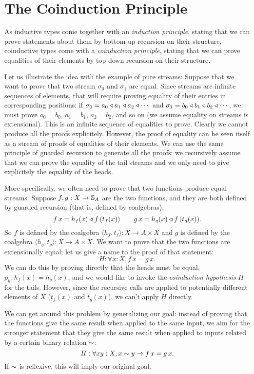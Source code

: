 \section{The Coinduction Principle}

As inductive types come together with an {\em induction principle}, stating that we can prove statements about them by bottom-up recursion on their structure, coinductive types come with a {\em coinduction principle}, stating that we can prove equalities of their elements by top-down recursion on their structure.

Let us illustrate the idea with the example of pure streams:
Suppose that we want to prove that two stream $\sigma_0$ and $\sigma_1$ are equal.
Since streams are infinite sequences of elements, that will require proving equality of their entries in corresponding positions: if $\sigma_0 = a_0\triangleleft a_1\triangleleft a_2\triangleleft \cdots$ and  $\sigma_1 = b_0\triangleleft b_1\triangleleft b_2\triangleleft \cdots$, we must prove $a_0 = b_0$, $a_1 = b_1$, $a_2=b_2$, and so on (we assume equality on streams is extensional).
This is an infinite sequence of equalities to prove.
Clearly we cannot produce all the proofs explicitely.
However, the proof of equality can be seen itself as a stream of proofs of equalities of their elements.
We can use the same principle of guarded recursion to generate all the proofs: we recursively assume that we can prove the equality of the tail streams and we only need to give explicitely the equality of the heads.

More specifically, we often need to prove that two functions produce equal streams.
Suppose $f,g:X \rightarrow \mathbb{S}_{A}$ are the two functions, and they are both defined by guarded recursion (that is, defined by coalgebras):
$$
f\,x = h_f(x) \triangleleft f\,(t_f(x)) \qquad g\,x = h_g(x) \triangleleft f\,(t_g(x)).
$$
So $f$ is defined by the coalgebra $\langle h_f, t_f\rangle : X \rightarrow A\times X$ and $g$ is defined by the coalgebra $\langle h_g, t_g\rangle : X \rightarrow A\times X$.
We want to prove that the two functions are extensionally equal; let us give a name to the proof of that statement:
$$
H: \forall x:X, f\,x = g\,x.
$$
We can do this by proving directly that the heads must be equal, $p_h:h_f(x) = h_g(x)$, and we would like to invoke the {\em coinduction hypothesis} $H$ for the tails.
However, since the recursive calls are applied to potentially different elements of $X$ ($t_f(x)$ and $t_g(x)$), we can't apply $H$ directly.

We can get around this problem by generalizing our goal: instead of proving that the functions give the same result when applied to the same input, we aim for the stronger statement that they give the same result when applied to inputs related by a certain binary relation $\sim$:
$$
H: \forall x y:X, x\sim y \rightarrow f\,x = g\,x.
$$
If $\sim$ is reflexive, this will imply our original goal.

